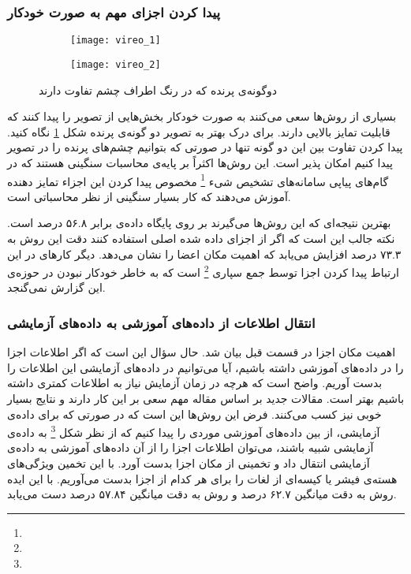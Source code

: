 \documentclass[11pt]{article}
\begin{document}
\subsubsection{پیدا کردن اجزای مهم به صورت خودکار}
\begin{figure}[t]
	\centering
	\begin{subfigure}[h]{0.35\textwidth}
		\centering
		\texttt{[image: vireo\_1]}
		\caption{}
	\end{subfigure}
	\begin{subfigure}[h]{0.35\textwidth}
		\centering
		\texttt{[image: vireo\_2]}
		\caption{}
	\end{subfigure}
	\caption{دوگونه‌ی پرنده که در رنگ اطراف چشم تفاوت دارند}
	\label{fig:fg_class:part_diff}
\end{figure}
بسیاری از روش‌ها
\cite{yao2011, yao2012, style_aware, poof}
سعی می‌کنند به صورت خودکار بخش‌هایی از تصویر را پیدا کنند که قابلیت تمایز بالایی دارند. برای درک بهتر به تصویر دو گونه‌ی پرنده شکل
\ref{fig:fg_class:part_diff}
نگاه کنید. پیدا کردن تفاوت بین این دو گونه تنها در صورتی که بتوانیم چشم‌های پرنده را در تصویر پیدا کنیم امکان پذیر است. این روش‌ها اکثراً بر پایه‌ی محاسبات سنگینی هستند که در گام‌های پیاپی سامانه‌های تشخیص شیء
\footnote{} مخصوص پیدا کردن این اجزاء تمایز دهنده آموزش می‌دهند که کار بسیار سنگینی از نظر محاسباتی است.

بهترین نتیجه‌ای که این روش‌ها می‌گیرند
\cite{poof}
بر روی پایگاه داده‌ی
\cite{cub2002011}
برابر ۵۶.۸ درصد است.
نکته جالب این است که اگر از اجزای داده شده اصلی استفاده کنند دقت این روش به ۷۳.۳ درصد افزایش می‌یابد که اهمیت مکان اعضا را نشان می‌دهد.
دیگر کارهای در این ارتباط پیدا کردن اجزا توسط جمع سپاری
\footnote{}
است
\cite{deng2013}
که به خاطر خودکار نبودن در حوزه‌ی این گزارش نمی‌گنجد.

\subsubsection{انتقال اطلاعات از داده‌های آموزشی به داده‌های آزمایشی}
اهمیت مکان اجزا در قسمت قبل بیان شد. حال سؤال این است که اگر اطلاعات اجزا را در داده‌های آموزشی داشته باشیم، آیا می‌توانیم در داده‌های آزمایشی این اطلاعات را بدست آوریم. واضح است که هرچه در زمان آزمایش نیاز به اطلاعات کمتری داشته باشیم بهتر است. مقالات جدید
\cite{gavves2013, goring2014}
بر اساس مقاله مهم
\cite{esvm}
سعی بر این کار دارند و نتایج بسیار خوبی نیز کسب می‌کنند. فرض این روش‌ها این است که در صورتی که برای داده‌ی آزمایشی، از بین داده‌های آموزشی موردی را پیدا کنیم که از نظر شکل
\footnote{}
به داده‌ی آزمایشی شبیه باشند، می‌توان اطلاعات اجزا را از آن داده‌های آموزشی به داده‌ی آزمایشی انتقال داد و تخمینی از مکان اجزا بدست آورد. با این تخمین ویژگی‌های هسته‌ی فیشر یا کیسه‌ای از لغات را برای هر کدام از اجزا بدست می‌آوریم. با این ایده روش
\cite{gavves2013}
به دقت میانگین ۶۲.۷ درصد و روش
\cite{goring2014}
به دقت میانگین ۵۷.۸۴ درصد دست می‌یابد.
\end{document}
